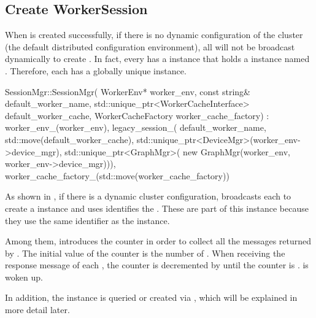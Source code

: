 \begin{content}
\subsection{Create WorkerSession}

When  is created successfully, if there is no dynamic configuration of the cluster (the default distributed configuration environment), all  will not be broadcast dynamically to create . In fact, every  has a  instance that holds a  instance named . Therefore, each  has a globally unique  instance.

\begin{leftbar}
\begin{c++}
SessionMgr::SessionMgr(
    WorkerEnv* worker_env, 
    const string& default_worker_name,
    std::unique_ptr<WorkerCacheInterface> default_worker_cache,
    WorkerCacheFactory worker_cache_factory)
    : worker_env_(worker_env),
      legacy_session_(
          default_worker_name, 
          std::move(default_worker_cache),
          std::unique_ptr<DeviceMgr>(worker_env->device_mgr),
          std::unique_ptr<GraphMgr>(
              new GraphMgr(worker_env, 
              worker_env->device_mgr))),
      worker_cache_factory_(std::move(worker_cache_factory)) {}
\end{c++}
\end{leftbar}

As shown in , if there is a dynamic cluster configuration,  broadcasts each  to create a  instance and uses  identifies the . These  are part of this  instance because they use the same  identifier as the  instance.

Among them,  introduces the  counter in order to collect all the  messages returned by . The initial value of the  counter is the number of . When receiving the response message of each , the counter is decremented by  until the counter is .  is woken up.

In addition, the  instance is queried or created via , which will be explained in more detail later.


\end{content}
